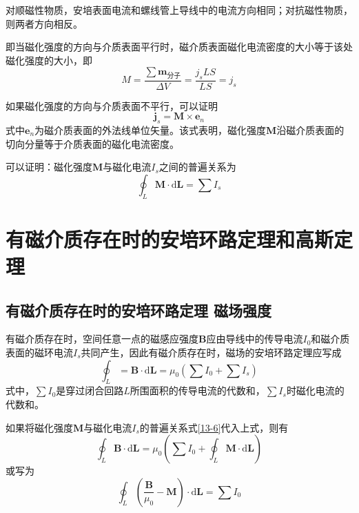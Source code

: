 \documentclass[
	12pt, %
	a4paper, %
]{myLegrandOrangeBook}
\newcommand{\rmd}{\mathrm{d}}
\begin{document}
对顺磁性物质，安培表面电流和螺线管上导线中的电流方向相同；对抗磁性物质，则两者方向相反。

即当磁化强度的方向与介质表面平行时，磁介质表面磁化电流密度的大小等于该处磁化强度的大小，即
\begin{equation}
    M = \frac{\sum  \boldsymbol{m}_{\text{分子}}}{\Delta V} = \frac{j_s L S}{L S} = j_s
\end{equation}

如果磁化强度的方向与介质表面不平行，可以证明
\begin{equation}
    \boldsymbol{j}_s = \boldsymbol{M} \times \boldsymbol{e}_n
\end{equation}
式中\(\boldsymbol{e}_n\)为磁介质表面的外法线单位矢量。该式表明，磁化强度\(\boldsymbol{M}\)沿磁介质表面的切向分量等于介质表面的磁化电流密度。

可以证明：磁化强度\(\boldsymbol{M}\)与磁化电流\(I_s\)之间的普遍关系为
\begin{equation}
    \oint_L \boldsymbol{M} \cdot \rmd \boldsymbol{L} = \sum I_s
    \label{13-6}
\end{equation}

\section{有磁介质存在时的安培环路定理和高斯定理}

\subsection{有磁介质存在时的安培环路定理 \quad 磁场强度}

有磁介质存在时，空间任意一点的磁感应强度\(\boldsymbol{B}\)应由导线中的传导电流\(I_0\)和磁介质表面的磁环电流\(I_s\)共同产生，因此有磁介质存在时，磁场的安培环路定理应写成
\begin{equation}
    \oint_L = \boldsymbol{B} \cdot \rmd \boldsymbol{L} = \mu_0 \left(\sum I_0 + \sum I_s\right)
\end{equation}
式中，\(\sum I_0\)是穿过闭合回路\(L\)所围面积的传导电流的代数和，\(\sum I_s\)时磁化电流的代数和。

如果将磁化强度\(\boldsymbol{M}\)与磁化电流\(I_s\)的普遍关系式\ref{13-6}代入上式，则有
\begin{equation}
    \oint_L \boldsymbol{B} \cdot \rmd \boldsymbol{L} = \mu_0 \left(\sum I_0 + \oint_L \boldsymbol{M} \cdot \rmd \boldsymbol{L}\right)
\end{equation}
或写为
\begin{equation}
    \oint_L \left(\frac{\boldsymbol{B}}{\mu_0} - \boldsymbol{M}\right) \cdot \rmd \boldsymbol{L} = \sum I_0
    \label{13-9}
\end{equation}
\end{document}

